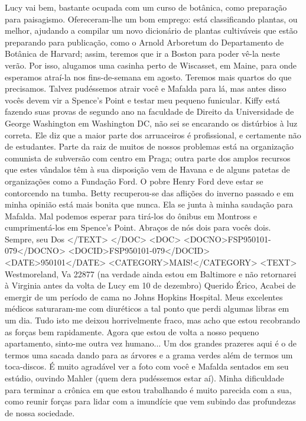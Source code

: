 Lucy vai bem, bastante ocupada com um curso de botânica, como preparação para paisagismo. Ofereceram-lhe um bom emprego: está classificando plantas, ou melhor, ajudando a compilar um novo dicionário de plantas cultiváveis que estão preparando para publicação, como o Arnold Arboretum do Departamento de Botânica de Harvard; assim, teremos que ir a Boston para poder vê-la neste verão. Por isso, alugamos uma casinha perto de Wiscasset, em Maine, para onde esperamos atraí-la nos fins-de-semana em agosto. Teremos mais quartos do que precisamos.
Talvez pudéssemos atrair você e Mafalda para lá, mas antes disso vocês devem vir a Spence's Point e testar meu pequeno funicular. Kiffy está fazendo suas provas de segundo ano na faculdade de Direito da Universidade de George Washington em Washington DC, não sei se encarando os distúrbios à luz correta. Ele diz que a maior parte dos arruaceiros é profissional, e certamente não de estudantes.
Parte da raiz de muitos de nossos problemas está na organização comunista de subversão com centro em Praga; outra parte dos amplos recursos que estes vândalos têm à sua disposição vem de Havana e de alguns patetas de organizações como a Fundação Ford. O pobre Henry Ford deve estar se contorcendo na tumba. Betty recuperou-se das aflições do inverno passado e em minha opinião está mais bonita que nunca. Ela se junta à minha saudação para Mafalda. Mal podemos esperar para tirá-los do ônibus em Montross e cumprimentá-los em Spence's Point.
Abraços de nós dois para vocês dois.
Sempre, seu 
Dos
</TEXT>
</DOC>
<DOC>
<DOCNO>FSP950101-079</DOCNO>
<DOCID>FSP950101-079</DOCID>
<DATE>950101</DATE>
<CATEGORY>MAIS!</CATEGORY>
<TEXT>
Westmoreland, Va 22877
(na verdade ainda estou em Baltimore e não retornarei à Virginia antes da volta de Lucy em 10 de dezembro)
Querido Érico,
Acabei de emergir de um período de cama no Johns Hopkins Hospital. Meus excelentes médicos saturaram-me com diuréticos a tal ponto que perdi algumas libras em um dia. Tudo isto me deixou horrivelmente fraco, mas acho que estou recobrando as forças bem rapidamente. Agora que estou de volta a nosso pequeno apartamento, sinto-me outra vez humano... Um dos grandes prazeres aqui é o de termos uma sacada dando para as árvores e a grama verdes além de termos um toca-discos.
É muito agradável ver a foto com você e Mafalda sentados em seu estúdio, ouvindo Mahler (quem dera pudéssemos estar aí). Minha dificuldade para terminar a crônica em que estou trabalhando é muito parecida com a sua, como reunir forças para lidar com a imundície que vem subindo das profundezas de nossa sociedade.
